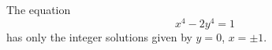 \begin{proposition}
    The equation
\[
    x^4-2y^4=1
\]
    has only the integer solutions given by $y=0$, $x=\pm1$.
\end{proposition}
